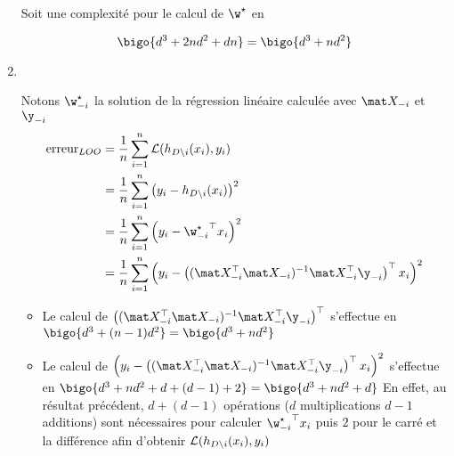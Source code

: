 \begin{enumerate}[resume]
\begin{reponse}
		      Soit une complexité pour le calcul de $\w^{\star}$ en

		      $$\bigo{d^3 + 2nd^2 + dn} = \bigo{d^3 + nd^2}$$

	      \end{reponse}

	\item {}\\

	      \begin{reponse}

		      Notons $\w_{-i}^{\star}$ la solution de la régression linéaire calculée avec $\X_{-i}$ et $\y_{-i}$
		      \begin{align*}
			      \mathrm{erreur}_{LOO}
			       & = \frac{1}{n}\sum_{i=1}^n \mathcal{L}(\hloo{i}(x_i), y_i)                                                        \\
			       & = \frac{1}{n}\sum_{i=1}^n \left(y_i - h_{D\backslash i}(x_i)\right)^2                                            \\
			       & = \frac{1}{n}\sum_{i=1}^n \left(y_i - {\w_{-i}^{\star}}^\top x_i\right)^2                                        \\
			       & = \frac{1}{n}\sum_{i=1}^n \left(y_i-\left((\X_{-i}^\top\X_{-i})^{-1}\X_{-i}^\top\y_{-i}\right)^\top x_i\right)^2
		      \end{align*}
		      \begin{itemize}
			      \item Le calcul de $\left((\X_{-i}^\top\X_{-i})^{-1}\X_{-i}^\top\y_{-i}\right)^\top$ s'effectue en $\bigo{d^3 + (n-1)d^2}=\bigo{d^3 + nd^2}$
			      \item Le calcul de $\left(y_i-\left((\X_{-i}^\top\X_{-i})^{-1}\X_{-i}^\top\y_{-i}\right)^\top x_i\right)^2$ s'effectue en $\bigo{d^3 + nd^2 + d + (d-1) + 2} = \bigo{d^3 + nd^2 + d}$ En effet, au résultat précédent, $d + (d-1)$ opérations ($d$ multiplications $d-1$ additions) sont nécessaires pour calculer ${\w_{-i}^{\star}}^\top x_i$ puis $2$ pour le carré et la différence afin d'obtenir $\mathcal{L}(h_{D\setminus i}(x_i), y_i)$


\end{itemize}
\end{reponse}
\end{enumerate}
